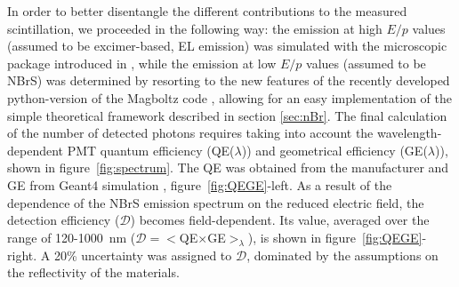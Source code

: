 \documentclass[%
 reprint,
superscriptaddress,
 amsmath,amssymb,
 aps,
]{revtex4-2}
\begin{document}
In order to better disentangle the different contributions to the measured scintillation, we proceeded in the following way: the emission at high $E/p$ values (assumed to be excimer-based, EL emission) was simulated with the microscopic package introduced in \cite{31}, while the emission at low $E/p$ values (assumed to be NBrS) was determined by resorting to the new features of the recently developed python-version of the Magboltz code \cite{Pyboltz}, allowing for an easy implementation of the simple theoretical framework described in section \ref{sec:nBr}. The final calculation of the number of detected photons requires taking into account the wavelength-dependent PMT quantum efficiency (QE($\lambda$)) and geometrical efficiency (GE($\lambda$)), shown in figure~\ref{fig:spectrum}. The QE was obtained from the manufacturer and GE from Geant4 simulation \cite{geant4}, figure~\ref{fig:QEGE}-left. As a result of the dependence of the NBrS emission spectrum on the reduced electric field, the detection efficiency ($\mathcal{D}$) becomes field-dependent. Its value, averaged over the range of 120-1000~nm ($\mathcal{D}=<$QE$\times$GE$>_\lambda$), is shown in figure~\ref{fig:QEGE}-right. A 20\% uncertainty was assigned to $\mathcal{D}$, dominated by the assumptions on the reflectivity of the materials.
\end{document}
